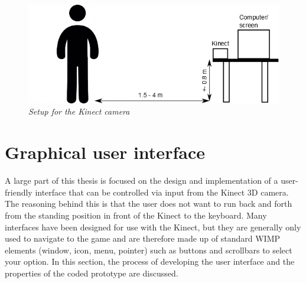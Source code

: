 \begin{figure}[H]
\begin{center}
\includegraphics[width=12cm]{SetupKinect.png}
\caption{\emph{Setup for the Kinect camera}}
\label{fig: kinect_setup}
\end{center}
\end{figure}



\section{Graphical user interface}

A large part of this thesis is focused on the design and implementation of a user-friendly interface that can be controlled via input from the Kinect 3D camera. The reasoning behind this is that the user does not want to run back and forth from the standing position in front of the Kinect to the keyboard. Many interfaces have been designed for use with the Kinect, but they are generally only used to navigate to the game and are therefore made up of standard WIMP elements (window, icon, menu, pointer) such as buttons and scrollbars to select your option. In this section, the process of developing the user interface and the properties of the coded prototype are discussed.\\

